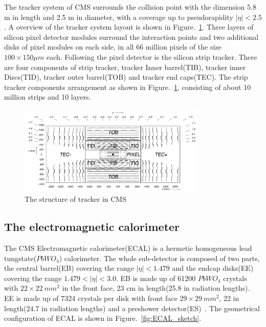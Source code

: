 The tracker system of CMS surrounds the collision point with the dimension 5.8 m in length and 2.5 m in diameter, with a coverage up to pseudorapidity $|\eta|<2.5$. A overview of the tracker system layout is shown in Figure.~\ref{fig:tracker_sketch}. Three layers of silicon pixel detector modules surround the interaction points and two additional disks of pixel modules on each side, in all 66 million pixels of the size $100\times150 \mu m$ each. Following the pixel detector is the silicon strip tracker. There are four components of strip tracker, tracker Inner barrel(TIB), tracker inner Discs(TID), tracker outer barrel(TOB) and tracker end caps(TEC). The strip tracker components arrangement as shown in Figure.~\ref{fig:tracker_sketch}, consisting of about 10 million strips and 10 layers. 


\begin{figure}[htbp] 
\centering
\includegraphics[width=0.8\textwidth]{chapter3/Tracker_structure.png}
\caption{The structure of tracker in CMS~\cite{CMS_experiment}}
\label{fig:tracker_sketch}
\end{figure}



\subsection{The electromagnetic calorimeter}

The CMS Electromagnetic calorimeter(ECAL) is a hermetic homogeneous lead tungstate($PbWO_{4}$) calorimeter. The whole sub-detector is composed of two parts, the central barrel(EB) covering the range $|\eta|<1.479$ and the endcap disks(EE) covering the range $1.479<|\eta|<3.0$. EB is made up of 61200 $PbWO_{4}$ crystals with $22\times22~mm^{2}$ in the front face, 23 cm in length(25.8 in radiation lengths). EE is made up of 7324 crystals per disk with front face $29\times29~mm^{2}$, 22 in length(24.7 in radiation lengths) and a preshower detector(ES)~\cite{CMS_TDR}. The geometrical configuration of ECAL is shown in Figure.~\ref{fig:ECAL_sketch}. 

